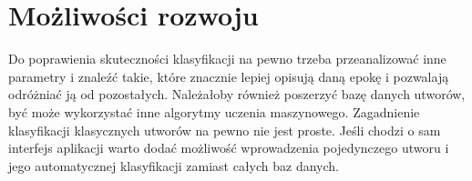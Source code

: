 \documentclass[printmode, eng, openany]{mgr}
\newcommand\tab[1][1cm]{\hspace*{#1}}
\begin{document}
\section{Możliwości rozwoju}
\tab Do poprawienia skuteczności klasyfikacji na pewno trzeba przeanalizować inne parametry i znaleźć takie, które znacznie lepiej opisują daną epokę i pozwalają odróżniać ją od pozostałych. Należałoby również poszerzyć bazę danych utworów, być może wykorzystać inne algorytmy uczenia maszynowego. Zagadnienie klasyfikacji klasycznych utworów na pewno nie jest proste. Jeśli chodzi o sam interfejs aplikacji warto dodać możliwość wprowadzenia pojedynczego utworu i jego automatycznej klasyfikacji zamiast całych baz danych.
\begin{flushleft}
\begin{thebibliography}{99}


\end{thebibliography}
\end{flushleft}
\end{document}
